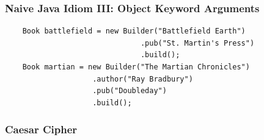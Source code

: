 \documentclass{beamer}
\begin{document}
\begin{frame}[fragile]
  \frametitle{Naive Java Idiom III: Object Keyword Arguments}
  \begin{lstlisting}
    Book battlefield = new Builder("Battlefield Earth")
                               .pub("St. Martin's Press") 
                               .build();
    Book martian = new Builder("The Martian Chronicles")
                    .author("Ray Bradbury")
                    .pub("Doubleday")
                    .build();
   \end{lstlisting}
\end{frame}



\begin{frame}
  \frametitle{Caesar Cipher}
  \inputminted{python}{caesar.py}
\end{frame}
\end{document}

